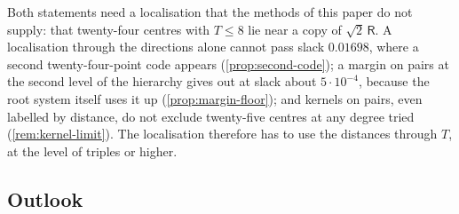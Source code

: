 \documentclass[11pt,reqno]{amsart}
\renewcommand{\_}{\origunderscore\allowbreak}
\numberwithin{equation}{section}
\theoremstyle{plain}
\theoremstyle{definition}
\theoremstyle{remark}
\newcommand{\Rt}{\mathsf{R}}                 %
\begin{document}
Both statements need a localisation that the methods of this paper do not
supply: that twenty-four centres with $T\le8$ lie near a copy of
$\sqrt2\,\Rt$. A localisation through the directions alone cannot pass slack
$0.01698$, where a second twenty-four-point code appears
(\cref{prop:second-code}); a margin on pairs at the second level of the
hierarchy gives out at slack about $5\cdot10^{-4}$, because the root system
itself uses it up (\cref{prop:margin-floor}); and kernels on pairs, even
labelled by distance, do not exclude twenty-five centres at any degree
tried (\cref{rem:kernel-limit}). The localisation therefore has to use the
distances through $T$, at the level of triples or higher.

\subsection{Outlook}
\end{document}
